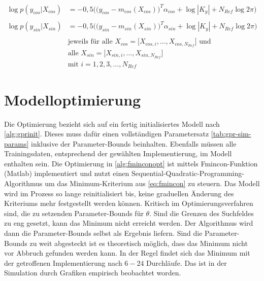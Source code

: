 \begin{align}\label{eq:likelihoods}
	\log p(y_{cos}|X_{cos}) &= -0,5 \Big( \big( y_{cos} - m_{cos}(X_{cos}) \big)^T \alpha_{cos} + \log|K_y| + N_{Ref} \log 2\pi  \Big) \nonumber \\
	\\
	\log p(y_{sin}|X_{sin}) &= -0,5 \Big( \big( y_{sin} - m_{sin}(X_{sin}) \big)^T \alpha_{sin} + \log|K_y| + N_{Ref} \log 2\pi  \Big) \nonumber \\
	\nonumber \\
& \text{jeweils für alle } X_{cos} = \big[ X_{cos,i},\dots, X_{cos,N_{Ref}} \big] \text{ und } \nonumber \\
& \text{alle } X_{sin} = \big[ X_{sin,i},\dots, X_{sin,N_{Ref}} \big] \nonumber \\
& \text{mit } i = 1,2,3,\ldots,N_{Ref} \nonumber	
\end{align}


\clearpage


\section{Modelloptimierung}\label{sec:gpropt}


Die Optimierung bezieht sich auf ein fertig initialisiertes Modell nach \autoref{alg:gprinit}. Dieses muss dafür einen vollständigen Parametersatz \autoref{tab:gpr-sim-params} inklusive der Parameter-Bounds beinhalten. Ebenfalls müssen alle Trainingsdaten, entsprechend der gewählten Implementierung, im Modell enthalten sein. Die Optimierung in \autoref{alg:fminconopt} ist mittels Fmincon-Funktion (Matlab) implementiert und nutzt einen Sequential-Quadratic-Programming-Algorithmus um das Minimum-Kriterium aus \autoref{eq:fmincon} zu steuern. Das Modell wird im Prozess so lange reinitialisiert bis, keine graduellen Änderung des Kriteriums mehr festgestellt werden können. Kritisch im Optimierungsverfahren sind, die zu setzenden Parameter-Bounds für $\theta$. Sind die Grenzen des Suchfeldes zu eng gesetzt, kann das Minimum nicht erreicht werden. Der Algorithmus wird dann die Parameter-Bounds selbst als Ergebnis liefern. Sind die Parameter-Bounds zu weit abgesteckt ist es theoretisch möglich, dass das Minimum nicht vor Abbruch gefunden werden kann. In der Regel findet sich das Minimum mit der getroffenen Implementierung nach $6-24$ Durchläufe. Das ist in der Simulation durch Grafiken empirisch beobachtet worden.


